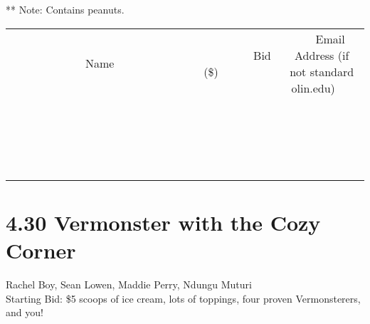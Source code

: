 \documentclass[11pt]{article}
\begin{document}
** Note: Contains peanuts.
\\[3ex]
\begin{tabular}{c c c}
~~~~~~~~~~~~~Name~~~~~~~~~~~~~ & ~~~~~~~~~Bid (\$)~~~~~~~~~  & ~~~Email Address (if not standard olin.edu)~~~\\
 & & \\
\hline
 & & \\
\hline
 & & \\
\hline
 & & \\
\hline
 & & \\
\hline
 & & \\
\hline
 & & \\
\hline
 & & \\
\hline
 & & \\
\hline
 & & \\
\hline
 & & \\
\hline
 & & \\
\hline
 & & \\
\hline
 & & \\
\hline
 & & \\
\hline
 & & \\
\hline
 & & \\
\hline
 & & \\
\hline
 & & \\
\hline
\end{tabular}
\newpage
\section*{4.30 Vermonster with the Cozy Corner}
Rachel Boy, Sean Lowen, Maddie Perry, Ndungu Muturi
\\
Starting Bid: \$5
 scoops of ice cream, lots of toppings, four proven Vermonsterers, and you! 
\end{document}
